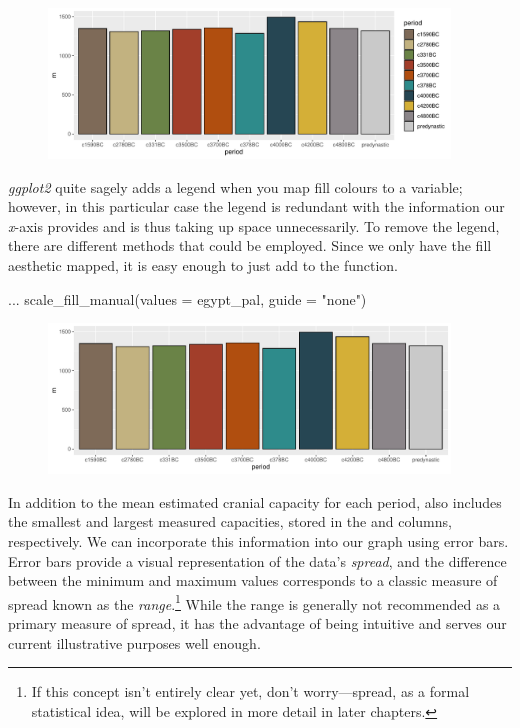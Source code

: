 \begin{figure}[H]
\includegraphics[width = 0.95\textwidth]{graphics/ch3Figs/bar_2.pdf}
\end{figure}

\noindent
\textit{ggplot2} quite sagely adds a legend when you map fill colours to a variable; however, in this particular case the legend is redundant with the information our \textit{x}-axis provides and is thus taking up space unnecessarily. To remove the legend, there are different methods that could be employed. Since we only have the fill aesthetic mapped, it is easy enough to just add  to the  function.

\begin{inR}
...
  scale_fill_manual(values = egypt_pal, guide = "none")
\end{inR}

\vspace{2em}

\begin{figure}[H]
\includegraphics[width = 0.95\textwidth]{graphics/ch3Figs/bar_3.pdf}
\end{figure}

In addition to the mean estimated cranial capacity for each period,  also includes the smallest and largest measured capacities, stored in the  and  columns, respectively. We can incorporate this information into our graph using \glspl{error bar}. Error bars provide a visual representation of the data's \textit{spread}, and the difference between the minimum and maximum values corresponds to a classic measure of spread known as the \textit{range}.\footnote{If this concept isn’t entirely clear yet, don’t worry—spread, as a formal statistical idea, will be explored in more detail in later chapters.} While the range is generally not recommended as a primary measure of spread, it has the advantage of being intuitive and serves our current illustrative purposes well enough.


